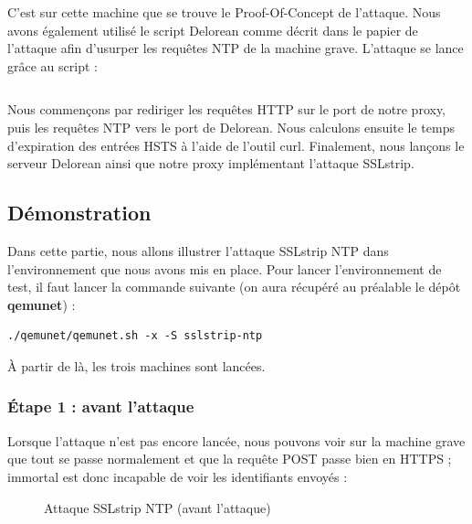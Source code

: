 C'est sur cette machine que se trouve le Proof-Of-Concept de l'attaque. Nous avons également utilisé le script Delorean \cite{delorean} comme décrit dans le papier de l'attaque afin d'usurper les requêtes NTP de la machine grave. L'attaque se lance grâce au script  :

\inputminted[bgcolor=lbcolor, breaklines]{php}{../sslstrip-ntp/immortal/attack.sh}

Nous commençons par rediriger les requêtes HTTP sur le port de notre proxy, puis les requêtes NTP vers le port de Delorean. Nous calculons ensuite le temps d'expiration des entrées HSTS à l'aide de l'outil curl. Finalement, nous lançons le serveur Delorean ainsi que notre proxy implémentant l'attaque SSLstrip.

\subsection{Démonstration}

Dans cette partie, nous allons illustrer l'attaque SSLstrip NTP dans l'environnement que nous avons mis en place. Pour lancer l'environnement de test, il faut lancer la commande suivante (on aura récupéré au préalable le dépôt \textbf{qemunet}) :

\begin{verbatim}
./qemunet/qemunet.sh -x -S sslstrip-ntp
\end{verbatim}

À partir de là, les trois machines sont lancées.

\subsubsection{Étape 1 : avant l'attaque}

Lorsque l'attaque n'est pas encore lancée, nous pouvons voir sur la machine grave que tout se passe normalement et que la requête POST passe bien en HTTPS ; immortal est donc incapable de voir les identifiants envoyés :

\begin{figure}[H]
  \caption{Attaque SSLstrip NTP (avant l'attaque)}
\end{figure}


